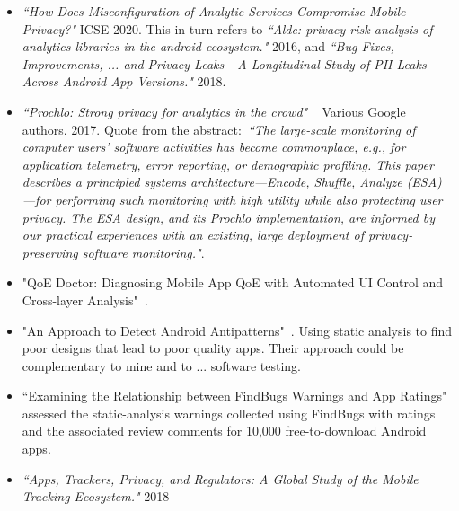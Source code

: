 \begin{itemize}
    \item \emph{``How Does Misconfiguration of Analytic Services Compromise Mobile Privacy?"} ICSE 2020. This in turn refers to \emph{``Alde: privacy risk analysis of analytics libraries in the android ecosystem."} 2016, and \emph{``Bug Fixes, Improvements, ... and Privacy Leaks - A Longitudinal Study of PII Leaks Across Android App Versions."} 2018.
    
    \item \emph{``Prochlo: Strong privacy for analytics in the crowd"}  ~\citep{prochlo2017_strong_privacy_analytics_in_the_crowd_46411} Various Google authors. 2017. Quote from the abstract:~\emph{``The large-scale monitoring of computer users' software activities has become commonplace, e.g., for application telemetry, error reporting, or demographic profiling. This paper describes a principled systems architecture---Encode, Shuffle, Analyze (ESA)---for performing such monitoring with high utility while also protecting user privacy. The ESA design, and its Prochlo implementation, are informed by our practical experiences with an existing, large deployment of privacy-preserving software monitoring."}.

    \item "QoE Doctor: Diagnosing Mobile App QoE with Automated UI Control and Cross-layer Analysis"~\cite{chen2014qoe}.
    \item "An Approach to Detect Android Antipatterns"~\cite{hecht2015approach}. Using static analysis to find poor designs that lead to poor quality apps. Their approach could be complementary to mine and to ... software testing.
    \item ``Examining the Relationship between FindBugs Warnings and App Ratings"~\cite{khalid2016_examining_the_relationship_between_findbugs_warnings_and_app_ratings} assessed the static-analysis warnings collected using FindBugs with ratings and the associated review comments for 10,000 free-to-download Android apps.
    
    \item \emph{``Apps, Trackers, Privacy, and Regulators: A Global Study of the Mobile Tracking Ecosystem."} 2018
    

\end{itemize}
